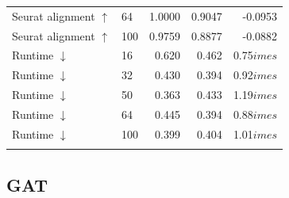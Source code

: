 \documentclass[10pt]{article}
\begin{document}
\begin{landscape}
\begin{longtable}{@{}llrrr@{}}
Seurat alignment $\uparrow$ & 64 & 1.0000 & 0.9047 & -0.0953 \\
Seurat alignment $\uparrow$ & 100 & 0.9759 & 0.8877 & -0.0882 \\
\addlinespace
Runtime $\downarrow$ & 16 & 0.620 & 0.462 & 0.75$	imes$ \\
Runtime $\downarrow$ & 32 & 0.430 & 0.394 & 0.92$	imes$ \\
Runtime $\downarrow$ & 50 & 0.363 & 0.433 & 1.19$	imes$ \\
Runtime $\downarrow$ & 64 & 0.445 & 0.394 & 0.88$	imes$ \\
Runtime $\downarrow$ & 100 & 0.399 & 0.404 & 1.01$	imes$ \\
\addlinespace
\bottomrule\end{longtable}\end{landscape}
\subsection{GAT}
\end{document}

